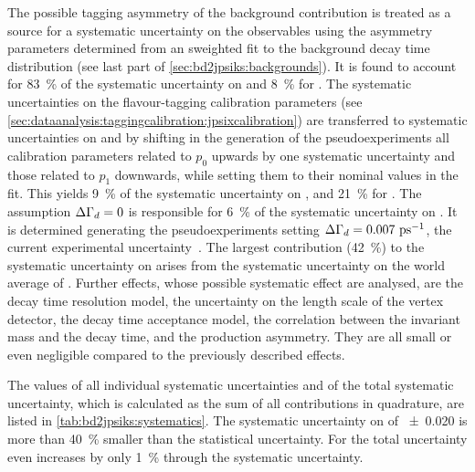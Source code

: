 The possible tagging asymmetry of the background contribution is treated as a
source for a systematic uncertainty on the \CP observables using the asymmetry
parameters determined from an sweighted fit to the background decay time
distribution (see last part of \cref{sec:bd2jpsiks:backgrounds}). It is found
to account for \SI{83}{\percent} of the systematic uncertainty on \SJpsiKS and
\SI{8}{\percent} for \CJpsiKS. The systematic uncertainties on the
flavour-tagging calibration parameters (see
\cref{sec:dataanalysis:taggingcalibration:jpsixcalibration}) are transferred
to systematic uncertainties on \SJpsiKS and \CJpsiKS by shifting in the
generation of the pseudoexperiments all calibration parameters related to
$p_0$ upwards by one systematic uncertainty and those related to $p_1$
downwards, while setting them to their nominal values in the fit. This yields
\SI{9}{\percent} of the systematic uncertainty on \SJpsiKS, and
\SI{21}{\percent} for \CJpsiKS. The assumption ${\Delta\Gamma_{{d}}} = 0$ is responsible for
\SI{6}{\percent} of the systematic uncertainty on \SJpsiKS. It is determined
generating the pseudoexperiments setting ${\Delta\Gamma_{{d}}} = \SI{0.007}{\ensuremath{{\mathrm{ \,ps^{-1}}}}}$, the
current experimental uncertainty~\cite{PDG2014}. The largest contribution
(\SI{42}{\percent}) to the systematic uncertainty on \CJpsiKS arises from the
systematic uncertainty on the world average of \dmd. Further effects, whose
possible systematic effect are analysed, are the decay
time resolution model, the uncertainty on the length scale of the vertex
detector, the decay time acceptance model, the correlation between the
invariant mass and the decay time, and the production asymmetry. They are all
small or even negligible compared to the previously described effects.

The values of all individual systematic uncertainties and of the total
systematic uncertainty, which is calculated as the sum of all contributions in
quadrature, are listed in \cref{tab:bd2jpsiks:systematics}. The systematic
uncertainty on \SJpsiKS of \num{\pm0.020} is more than \SI{40}{\percent}
smaller than the statistical uncertainty. For \CJpsiKS the total uncertainty
even increases by only \SI{1}{\percent} through the systematic uncertainty.

